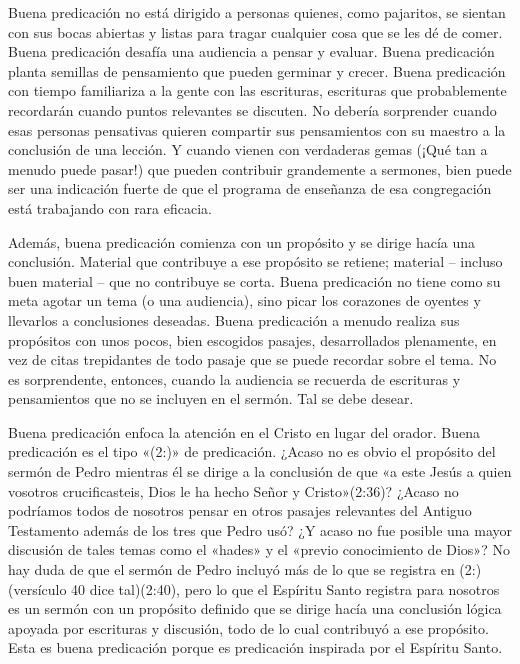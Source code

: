 \documentclass[12pt, twoside, openright]{book}
\begin{document}
Buena predicación no está dirigido a personas quienes, como pajaritos, se sientan con sus bocas abiertas y listas para tragar cualquier cosa que se les dé de comer. Buena predicación desafía una audiencia a pensar y evaluar. Buena predicación planta semillas de pensamiento que pueden germinar y crecer. Buena predicación con tiempo familiariza a la gente con las escrituras, escrituras que probablemente recordarán cuando puntos relevantes se discuten. No debería sorprender cuando esas personas pensativas quieren compartir sus pensamientos con su maestro a la conclusión de una lección. Y cuando vienen con verdaderas gemas (¡Qué tan a menudo puede pasar!) que pueden contribuir grandemente a sermones, bien puede ser una indicación fuerte de que el programa de enseñanza de esa congregación está trabajando con rara eficacia. 

Además, buena predicación comienza con un propósito y se dirige hacía una conclusión. Material que contribuye a ese propósito se retiene; material – incluso buen material – que no contribuye se corta. Buena predicación no tiene como su meta agotar un tema (o una audiencia), sino picar los corazones de oyentes y llevarlos a conclusiones deseadas. Buena predicación a menudo realiza sus propósitos con unos pocos, bien escogidos pasajes, desarrollados plenamente, en vez de citas trepidantes de todo pasaje que se puede recordar sobre el tema. No es sorprendente, entonces, cuando la audiencia se recuerda de escrituras y pensamientos que no se incluyen en el sermón. Tal se debe desear. 

Buena predicación enfoca la atención en el Cristo en lugar del orador. Buena predicación es el tipo «(2:)» de predicación. ¿Acaso no es obvio el propósito del sermón de Pedro mientras él se dirige a la conclusión de que «a este Jesús a quien vosotros crucificasteis, Dios le ha hecho Señor y Cristo»(2:36)? ¿Acaso no podríamos todos de nosotros pensar en otros pasajes relevantes del Antiguo Testamento además de los tres que Pedro usó? ¿Y acaso no fue posible una mayor discusión de tales temas como el «hades» y el «previo conocimiento de Dios»? No hay duda de que el sermón de Pedro incluyó más de lo que se registra en (2:) (versículo 40 dice tal)(2:40), pero lo que el Espíritu Santo registra para nosotros es un sermón con un propósito definido que se dirige hacía una conclusión lógica apoyada por escrituras y discusión, todo de lo cual contribuyó a ese propósito. Esta es buena predicación porque es predicación inspirada por el Espíritu Santo.
\end{document}

